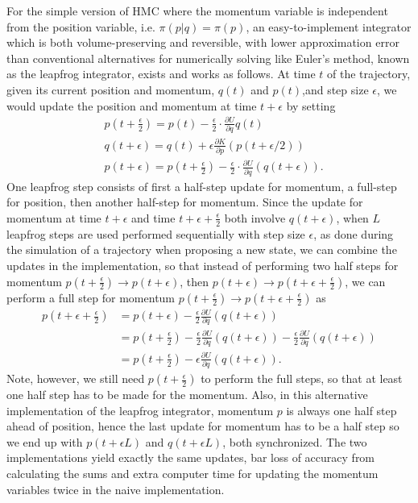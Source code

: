 \documentclass[12pt]{report}
\begin{document}
For the simple version of HMC where the momentum variable is independent from the position variable, i.e. $\pi(p|q)=\pi(p)$, an easy-to-implement integrator which is both volume-preserving and reversible, with lower approximation error than conventional alternatives for numerically solving like Euler's method, known as the leapfrog integrator, exists and works as follows. At time $t$ of the trajectory, given its current position and momentum, $q(t)$ and $p(t)$,and step size $\epsilon$, we would update the position and momentum at time $t+\epsilon$ by setting 
\begin{align*}
    &p(t+\frac{\epsilon}{2}) = p(t) - \frac{\epsilon}{2}\cdot \frac{\partial
    U}{\partial
    q}q(t) \\
    &q(t+\epsilon) = q(t) + \epsilon  \frac{\partial K}{\partial p}(p(t+\epsilon/2))
    \\
    &p(t+\epsilon) = p(t + \frac{\epsilon}{2}) - \frac{\epsilon} {2} \cdot \frac{\partial U}{\partial
    q}(q(t+\epsilon)).
\end{align*}
One leapfrog step consists of first a half-step update for momentum, a full-step
for position, then another half-step for momentum. Since the update for momentum
at time $t+\epsilon$ and time $t+\epsilon + \frac{\epsilon}{2}$ both involve
$q(t+\epsilon)$, when $L$ leapfrog steps are used performed sequentially with
 step size $\epsilon$, as done during the simulation of a trajectory when proposing a new
 state,  we can combine the updates in the implementation, so that instead of performing two half steps for momentum $p(t+\frac{\epsilon}{2}) \rightarrow p(t+\epsilon)$, then $ p(t+\epsilon) \rightarrow p(t+\epsilon + \frac{\epsilon}{2})$, we can perform a full step for momentum $p(t+\frac{\epsilon}{2}) \rightarrow p(t+ \epsilon + \frac{\epsilon}{2}) $ as 
\begin{align}
p(t+\epsilon + \frac{\epsilon}{2})  
&= p(t+\epsilon) - \frac{\epsilon}{2} \frac{\partial U}{\partial q }(q(t+\epsilon)) \\
&= p(t+\frac{\epsilon}{2}) - \frac{\epsilon}{2} \frac{\partial U}{\partial q }(q(t+\epsilon)) - \frac{\epsilon}{2} \frac{\partial U}{\partial q }(q(t+\epsilon)) \\
&= p(t+\frac{\epsilon}{2}) - \epsilon \frac{\partial U}{\partial q }(q(t+\epsilon)).
\end{align}
Note, however, we still need $p(t+\frac{\epsilon}{2})$ to perform the full
steps, so that at least one half step has to be made for the momentum. Also, in
this alternative implementation of the leapfrog integrator, momentum $p$ is
always one half step ahead of position, hence the last update for momentum has
to be a half step so we end up with $p(t+\epsilon L)$ and $q(t+\epsilon L )$,
both synchronized. The two implementations yield exactly the same updates, bar
loss of accuracy from calculating the sums and extra computer time for updating
the momentum variables twice in the naive implementation. 
\end{document}
